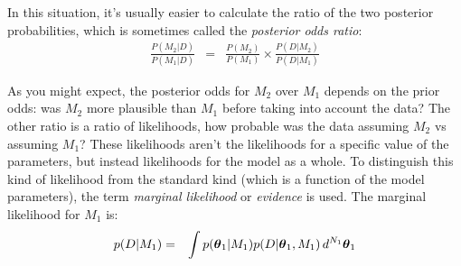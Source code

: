 In this situation, it's usually easier to calculate the ratio of the two
posterior probabilities, which is sometimes called the {\it posterior odds
ratio}:
\begin{eqnarray}
\frac{P(M_2 | D)}{P(M_1 | D)} &=& \frac{P(M_2)}{P(M_1)}
\times \frac{P(D | M_2)}{P(D | M_1)}
\end{eqnarray}

As you might expect, the posterior odds for $M_2$ over $M_1$ depends on the
prior odds: was $M_2$ more plausible than $M_1$ before taking into account the
data? The other ratio is a ratio of likelihoods, how probable was the data
assuming $M_2$ vs assuming $M_1$? These likelihoods aren't the likelihoods
for a specific value of the parameters, but instead likelihoods for the model
as a whole. To distinguish this kind of likelihood from the standard kind (which
is a function of the model parameters), the term {\it marginal likelihood} or
{\it evidence} is used. The marginal likelihood for $M_1$ is:
\begin{eqnarray}
p(D | M_1) &=& \int p(\boldsymbol{\theta}_1 | M_1) p(D | \boldsymbol{\theta}_1, M_1) \, d^{N_1} \boldsymbol{\theta}_1
\end{eqnarray}







%

